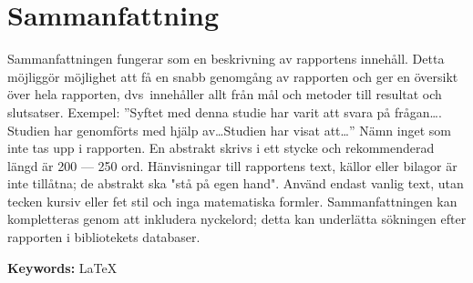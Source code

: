 \section*{Sammanfattning}\label{sec:sammanfattning}
Sammanfattningen fungerar som en beskrivning av rapportens innehåll. Detta möjliggör möjlighet att
få en snabb genomgång av rapporten och ger en översikt över hela rapporten, dvs\ innehåller allt
från mål och metoder till resultat och slutsatser. Exempel: ”Syftet med denna studie har varit att
svara på frågan\dots. Studien har genomförts med hjälp av\dots Studien har visat att\dots” Nämn
inget som inte tas upp i rapporten. En abstrakt skrivs i ett stycke och rekommenderad längd är 200
--- 250 ord. Hänvisningar till rapportens text, källor eller bilagor är inte tillåtna; de abstrakt
ska "stå på egen hand". Använd endast vanlig text, utan tecken kursiv eller fet stil och inga
matematiska formler. Sammanfattningen kan kompletteras genom att inkludera nyckelord; detta kan
underlätta sökningen efter rapporten i bibliotekets databaser.

\textbf{Keywords:} LaTeX 
